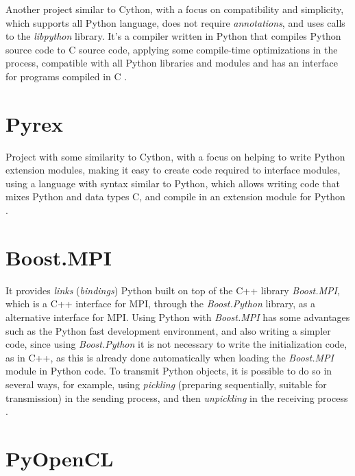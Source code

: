 Another project similar to Cython, with a focus on compatibility and simplicity, which supports all Python language, does not require \textit{annotations}, and uses calls to the \textit{libpython} library. It's a compiler written in Python that compiles Python source code to C source code, applying some compile-time optimizations in the process, compatible with all Python libraries and modules and has an interface for programs compiled in C \cite{Van2007}.




\section{Pyrex}

Project with some similarity to Cython, with a focus on helping to write Python extension modules, making it easy to create code required to interface modules, using a language with syntax similar to Python, which allows writing code that mixes Python and data types C, and compile in an extension module for Python \cite{Oliphant2007}.




\section{Boost.MPI}

It provides \textit{links} (\textit{bindings}) Python built on top of the C++ library \textit{Boost.MPI}, which is a C++ interface for MPI, through the \textit{Boost.Python} library, as a alternative interface for MPI. Using Python with \textit{Boost.MPI} has some advantages such as the Python fast development environment, and also writing a simpler code, since using \textit{Boost.Python} it is not necessary to write the initialization code, as in C++, as this is already done automatically when loading the \textit{Boost.MPI} module in Python code. To transmit Python objects, it is possible to do so in several ways, for example, using \textit{pickling} (preparing sequentially, suitable for transmission) in the sending process, and then \textit{unpickling} in the receiving process \cite{Abrahams2003}.




\section{PyOpenCL}

